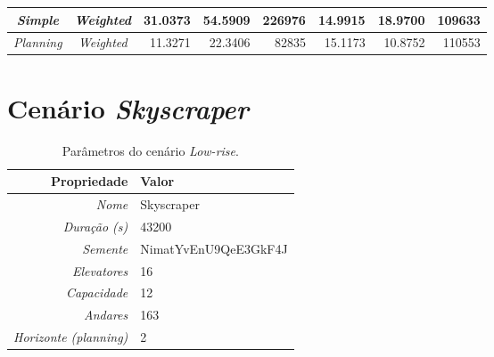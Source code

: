 \begin{table}[htb!]
\begin{tabular}{|c|c|r|r|r|r|r|r|}
\textit{Simple}      & \textit{Weighted}        & 31.0373                         & 54.5909                         & 226976                          & \cellcolor[HTML]{67FD9A}14.9915 & 18.9700                         & \cellcolor[HTML]{67FD9A}109633  \\ \hline
\textit{Planning}    & \textit{Weighted}        & 11.3271                         & 22.3406                         &  82835                          & 15.1173                         & 10.8752                         & 110553                          \\ \hline
\end{tabular}
\end{table}

\section{Cenário \textit{Skyscraper}}

\lipsum[1]

\begin{table}[htb!]
\centering
\caption{Parâmetros do cenário \textit{Low-rise}.}
\label{tab:results:skyscraper:params}
\begin{tabular}{|r|l|}
\hline
\textbf{Propriedade}          & \textbf{Valor}       \\ \hline
\textit{Nome}                 & Skyscraper           \\ \hline
\textit{Duração (s)}          & 43200                \\ \hline
\textit{Semente}              & NimatYvEnU9QeE3GkF4J \\ \hline
\textit{Elevatores}           & 16                   \\ \hline
\textit{Capacidade}           & 12                   \\ \hline
\textit{Andares}              & 163                  \\ \hline
\textit{Horizonte (planning)} & 2                    \\ \hline
\end{tabular}
\end{table}

